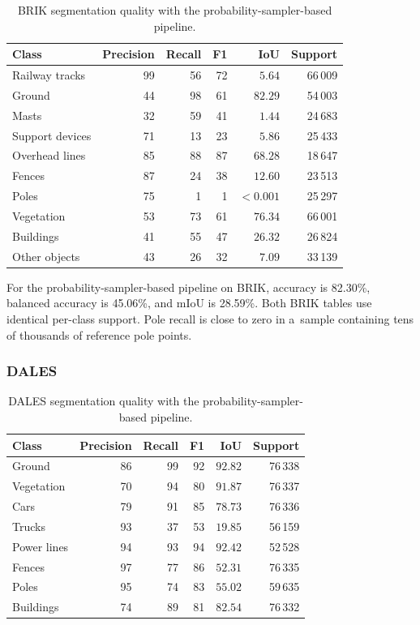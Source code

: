 \begin{table}[H]
  \centering
  \caption{BRIK segmentation quality with the probability-sampler-based pipeline.}
  \label{tab:brik_probability}
  \small
  \begin{tabular}{lrrrrr}
    \toprule
    Class & Precision & Recall & F1 & IoU & Support \\
    \midrule
    Railway tracks & 99 & 56 & 72 & $5.64$ & 66\,009 \\
    Ground & 44 & 98 & 61 & $82.29$ & 54\,003 \\
    Masts & 32 & 59 & 41 & $1.44$ & 24\,683 \\
    Support devices & 71 & 13 & 23 & $5.86$ & 25\,433 \\
    Overhead lines & 85 & 88 & 87 & $68.28$ & 18\,647 \\
    Fences & 87 & 24 & 38 & $12.60$ & 23\,513 \\
    Poles & 75 & 1 & 1 & $<0.001$ & 25\,297 \\
    Vegetation & 53 & 73 & 61 & $76.34$ & 66\,001 \\
    Buildings & 41 & 55 & 47 & $26.32$ & 26\,824 \\
    Other objects & 43 & 26 & 32 & $7.09$ & 33\,139 \\
    \bottomrule
  \end{tabular}
\end{table}

For the probability-sampler-based pipeline on BRIK, accuracy is 82.30\%, balanced accuracy is 45.06\%, and mIoU is 28.59\%. Both BRIK tables use identical per-class support. Pole recall is close to zero in a~sample containing tens of thousands of reference pole points.

\subsubsection{DALES}

\begin{table}[H]
  \centering
  \caption{DALES segmentation quality with the probability-sampler-based pipeline.}
  \label{tab:dales_probability}
  \small
  \begin{tabular}{lrrrrr}
    \toprule
    Class & Precision & Recall & F1 & IoU & Support \\
    \midrule
    Ground & 86 & 99 & 92 & $92.82$ & 76\,338 \\
    Vegetation & 70 & 94 & 80 & $91.87$ & 76\,337 \\
    Cars & 79 & 91 & 85 & $78.73$ & 76\,336 \\
    Trucks & 93 & 37 & 53 & $19.85$ & 56\,159 \\
    Power lines & 94 & 93 & 94 & $92.42$ & 52\,528 \\
    Fences & 97 & 77 & 86 & $52.31$ & 76\,335 \\
    Poles & 95 & 74 & 83 & $55.02$ & 59\,635 \\
    Buildings & 74 & 89 & 81 & $82.54$ & 76\,332 \\
    \bottomrule
  \end{tabular}
\end{table}

